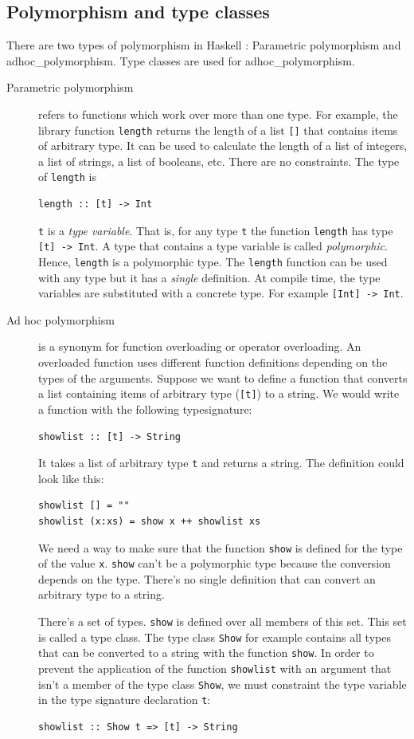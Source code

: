 \subsection{Polymorphism and type classes}
\label{sec:polymorphism}
There are two types of polymorphism in Haskell \cite{Cardelli}: Parametric polymorphism and \gls{adhoc_polymorphism}. Type classes are used for \gls{adhoc_polymorphism}.
\begin{description}
\item[Parametric polymorphism] refers to functions which work over more than one type. For example, the library function \verb|length| returns the length of a list \verb|[]| that contains items of arbitrary type. It can be used to calculate the length of a list of integers, a list of strings, a list of booleans, etc. There are no constraints. The type of \verb|length| is
\begin{verbatim}
length :: [t] -> Int
\end{verbatim}
\verb|t| is a \emph{type variable}. That is, for any type \verb|t| the function \verb|length| has type \verb|[t] -> Int|. A type that contains a type variable is called \emph{polymorphic}. Hence, \verb|length| is a polymorphic type.
The \verb|length| function can be used with any type but it has a \emph{single} definition.  At compile time, the type variables are substituted with a concrete type. For example
\verb|[Int] -> Int|. 
\item[Ad hoc polymorphism] is a synonym for function overloading or operator overloading. An overloaded function uses different function definitions depending on the types of the arguments. Suppose we want to define a function that converts a list containing items of arbitrary type (\verb|[t]|) to a string. We would write a function with the following \gls{typesignature}:
\begin{verbatim}
showlist :: [t] -> String
\end{verbatim}
It takes a list of arbitrary type \verb|t| and returns a string. The definition could look like this:
\begin{verbatim}
showlist [] = ""
showlist (x:xs) = show x ++ showlist xs
\end{verbatim}
We need a way to make sure that the function \verb|show| is defined for the type of the value \verb|x|. \verb|show| can't be a polymorphic type because the conversion depends on the type. There's no single definition that can convert an arbitrary type to a string. 

There's a set of types. \verb|show| is defined over all members of this set. This set is called a type class. The type class \verb|Show| for example contains all types that can be converted to a string with the function \verb|show|. In order to prevent the application of the function \verb|showlist| with an argument that isn't a member of the type class \verb|Show|, we must constraint the type variable in the type signature declaration \verb|t|:
\begin{verbatim}
showlist :: Show t => [t] -> String
\end{verbatim}
\end{description}

